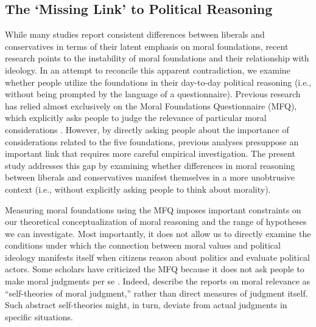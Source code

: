 \documentclass[12pt]{article}
\begin{document}
\subsection{The `Missing Link' to Political Reasoning}

While many studies report consistent differences between liberals and conservatives in terms of their latent emphasis on moral foundations, recent research points to the instability of moral foundations and their relationship with ideology. In an attempt to reconcile this apparent contradiction, we examine whether people utilize the foundations in their day-to-day political reasoning (i.e., without being prompted by the language of a questionnaire). Previous research has relied almost exclusively on the Moral Foundations Questionnaire (MFQ), which explicitly asks people to judge the relevance of particular moral considerations \citep[e.g.][]{graham2011mapping}. However, by directly asking people about the importance of considerations related to the five foundations, previous analyses presuppose an important link that requires more careful empirical investigation. The present study addresses this gap by examining whether differences in moral reasoning between liberals and conservatives manifest themselves in a more unobtrusive context (i.e., without explicitly asking people to think about morality). 

Measuring moral foundations using the MFQ imposes important constraints on our theoretical conceptualization of moral reasoning and the range of hypotheses we can investigate. Most importantly, it does not allow us to directly examine the conditions under which the connection between moral values and political ideology manifests itself when citizens reason about politics and evaluate political actors. Some scholars have criticized the MFQ because it does not ask people to make moral judgments per se \citep[e.g.][]{clifford2015moral}. Indeed, \citet[1031]{graham2009liberals} describe the reports on moral relevance as ``self-theories of moral judgment,'' rather than direct measures of judgment itself. Such abstract self-theories might, in turn, deviate from actual judgments in specific situations.
\end{document}
